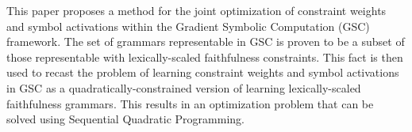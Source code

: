 This paper proposes a method for the joint optimization of constraint weights and symbol activations within the Gradient Symbolic Computation (GSC) framework. The set of grammars representable in GSC is proven to be a subset of those representable with lexically-scaled faithfulness constraints. This fact is then used to recast the problem of learning constraint weights and symbol activations in GSC as a quadratically-constrained version of learning lexically-scaled faithfulness grammars. This results in an optimization problem that can be solved using Sequential Quadratic Programming.
